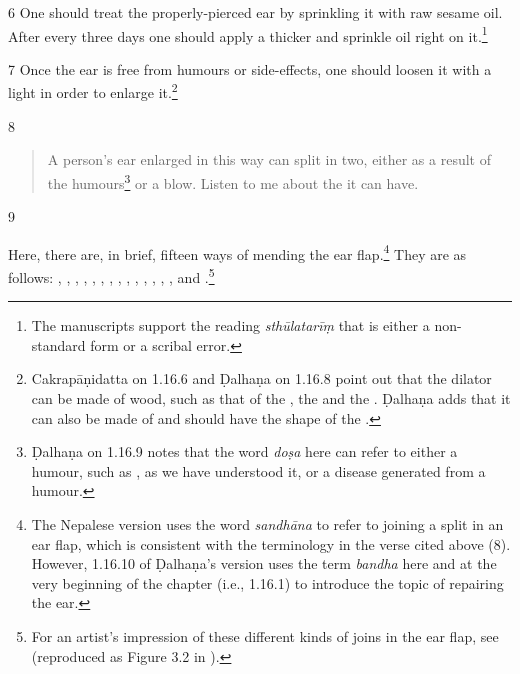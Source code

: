 \begin{translation}
    \item[6] One should treat the properly-pierced ear by sprinkling it with raw sesame
    oil.   After every three days one should apply a thicker  and
    sprinkle oil right on it.\footnote{The manuscripts support the reading
    \emph{sthūlatarīṃ} that is either a non-standard form or a scribal error.}
    
    \item[7]
    Once the ear is free from humours or side-effects, one should 
    loosen it with a light  in order to enlarge it.\footnote{Cakrapāṇidatta on 1.16.6 \citep[127]{acar-1939} and Ḍalhaṇa on 1.16.8 \citep[77]{vulgate} point out that the dilator can be made of wood, such as that of the , the  and the . Ḍalhaṇa adds that it can also be made of  and should have the shape of the .}
    
    \item[8]
    
    \begin{verse}

A person's ear enlarged in this way can split in two, either as a result of the humours\footnote{Ḍalhaṇa on 1.16.9  \citep[77]{vulgate} notes that the word \emph{doṣa} here can refer to either a humour, such as , as we have understood it, or a disease generated from a humour.} or a blow. Listen to me about the  it can have.
        
    \end{verse}
    
        \item[9]
    
Here, there are, in brief, fifteen ways of mending the ear flap.\footnote{The Nepalese version uses the word \emph{sandhāna} to refer to joining a split in an ear flap, which is consistent with the terminology in the verse cited above (8). However, 1.16.10 of Ḍalhaṇa's version \citep[77]{vulgate} uses the term \emph{bandha} here and at the very beginning of the chapter (i.e., 1.16.1) to introduce the topic of repairing the ear.}  They are as follows:
    , , , , , , , , , , 
    , ,
    , , and .\footnote{For an artist's impression of these different kinds of joins in the ear flap, see \cite[290]{majn-1975} (reproduced as Figure 3.2 in \cite[154]{wuja-2003}).}
    

\end{translation}
